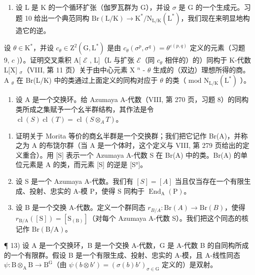 \begin{enumerate}
\def\labelenumi{\arabic{enumi})}
\setcounter{enumi}{10}
\tightlist
\item
  设 L 是 K 的一个循环扩张（伽罗瓦群为 G），并设 \(\sigma\) 是 G 的一个生成元。习题 10 给出一个典范同构 \(\mathrm{Br}(\mathrm{L}/\mathrm{K}) \to \mathrm{K}^{*}/\mathrm{N}_{\mathrm{L}/\mathrm{K}}(\mathrm{L}^{*})\)，我们现在来明显地构造它的逆。
\end{enumerate}

设 \(\theta \in \mathrm{K}^*\)，并设 \(c_{\theta} \in \mathrm{Z}^{2}(\mathrm{G}, \mathrm{L}^{*})\) 是由 \(c_{\theta}(\sigma^{p}, \sigma^{q}) = \theta^{\varepsilon(p,q)}\) 定义的元素（习题 9, \(c\) )）。证明交叉乘积 A{[} \(\mathcal{E}\) , L{]}（L 与扩张 \(\mathcal{E}\)（同 \(c_{\theta}\) 相伴的）的）同构于 K-代数 L{[}X{]} \(_{\sigma}\)（VIII, 第 11 页）关于由中心元素 X \(^{n}\) - \(\theta\) 生成的（双边）理想所得的商。A \(_{\theta}\) 在 Br(L/K) 中的类通过上面定义的同构对应于 \(\theta\) 的类（ \(\text{mod } \mathrm{N}_{\mathrm{L/K}}(\mathrm{L}^{*})\) ）。

\begin{enumerate}
\def\labelenumi{\arabic{enumi})}
\setcounter{enumi}{11}
\tightlist
\item
  设 A 是一个交换环。给 Azumaya A-代数（VIII, 第 270 页，习题 8）的同构类所成之集赋予一个幺半群结构，其作法是令 \(\operatorname{cl}(S)\operatorname{cl}(T)=\operatorname{cl}(S\otimes_{A}T)\)。
\end{enumerate}

\begin{enumerate}
\def\labelenumi{\alph{enumi})}
\item
  证明关于 Morita 等价的商幺半群是一个交换群；我们把它记作 Br(A)，并称之为 A 的布饶尔群（当 A 是一个体时，这个定义与 VIII, 第 279 页给出的定义重合）。用 {[}S{]} 表示一个 Azumaya A-代数 S 在 Br(A) 中的类。Br(A) 的单位元素是 A 的类，而元素 {[}S{]} 的逆是 {[}S°{]}。
\item
  设 S 是一个 Azumaya A-代数。我们有 \([S] = [A]\) 当且仅当存在一个有限生成、投射、忠实的 A-模 P，使得 S 同构于 \(\operatorname{End}_{\mathrm{A}}(\mathrm{P})\)。
\item
  设 B 是一个交换 A-代数。定义一个群同态 \(r_{B/A} : \mathrm{Br}(A) \to \mathrm{Br}(B)\)，使得 \(r_{\mathrm{B/A}}([\mathrm{S}]) = [\mathrm{S}_{(\mathrm{B})}]\)（对每个 Azumaya A-代数 S）。我们把这个同态的核记作 \(\mathrm{Br(B/A)}\)。
\end{enumerate}

¶ 13) 设 A 是一个交换环，B 是一个交换 A-代数，G 是 A-代数 B 的自同构所成的一个有限群。假设 B 是一个有限生成、投射、忠实的 A-模，且 A-线性同态 \(\psi : \mathrm{B} \otimes_{\mathrm{A}} \mathrm{B} \to \mathrm{B}^{\mathrm{G}}\)（由 \(\psi(b \otimes b') = (\sigma(b)b')_{\sigma \in \mathrm{G}}\) 定义的）是双射。

